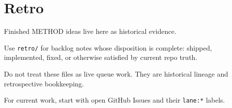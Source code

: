 \chapter{Retro}\label{record-394}

\smallskip

Finished METHOD ideas live here as historical evidence.

Use \texttt{r\allowbreak{}e\allowbreak{}t\allowbreak{}r\allowbreak{}o\allowbreak{}/} for backlog notes whose disposition is complete: shipped, implemented, fixed, or otherwise satisfied by current repo truth.

Do not treat these files as live queue work. They are historical lineage and retrospective bookkeeping.

For current work, start with open GitHub Issues and their \texttt{l\allowbreak{}a\allowbreak{}n\allowbreak{}e\allowbreak{}:\allowbreak{}*} labels.

